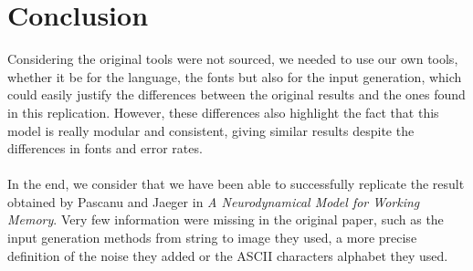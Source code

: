 \section{Conclusion}

Considering the original tools were not sourced, we needed to use our own tools, whether it be for the language, the fonts but also for the input generation, which could easily justify the differences between the original results and the ones found in this replication. However, these differences also highlight the fact that this model is really modular and consistent, giving similar results despite the differences in fonts and error rates. \\
\\
In the end, we consider that we have been able to successfully replicate the result obtained by Pascanu and Jaeger in \textit{A Neurodynamical Model for Working Memory}.
Very few information were missing in the original paper, such as the input generation methods from string to image they used, a more precise definition of the noise they added or the ASCII characters alphabet they used.
